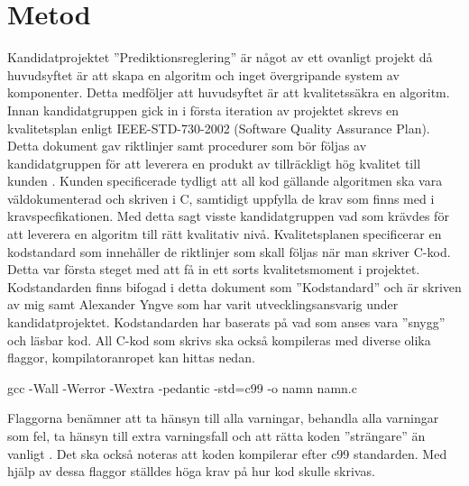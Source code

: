 \section{Metod}
Kandidatprojektet ''Prediktionsreglering'' är något av ett ovanligt projekt då huvudsyftet är att skapa en algoritm och inget övergripande system av komponenter. Detta medföljer att huvudsyftet är att kvalitetssäkra en algoritm.
\newline
\newline
Innan kandidatgruppen gick in i första iteration av projektet skrevs en kvalitetsplan enligt IEEE-STD-730-2002 (Software Quality Assurance Plan). Detta dokument gav riktlinjer samt procedurer som bör följas av kandidatgruppen för att leverera en produkt av tillräckligt hög kvalitet till kunden \citep{SQAP}. Kunden specificerade tydligt att all kod gällande algoritmen ska vara väldokumenterad och skriven i C, samtidigt uppfylla de krav som finns med i kravspecfikationen. Med detta sagt visste kandidatgruppen vad som krävdes för att leverera en algoritm till rätt kvalitativ nivå. Kvalitetsplanen specificerar en kodstandard som innehåller de riktlinjer som skall följas när man skriver C-kod. Detta var första steget med att få in ett sorts kvalitetsmoment i projektet. Kodstandarden finns bifogad i detta dokument som ''Kodstandard'' och är skriven av mig samt Alexander Yngve som har varit utvecklingsansvarig under kandidatprojektet. Kodstandarden har baserats på vad som anses vara ''snygg'' och läsbar kod. All C-kod som skrivs ska också kompileras med diverse olika flaggor, kompilatoranropet kan hittas nedan.
\begin{tcolorbox}[boxrule=1pt,leftrule=5pt,arc=0pt,auto outer arc]
gcc -Wall -Werror -Wextra -pedantic -std=c99 -o namn namn.c
\end{tcolorbox}
\noindent Flaggorna benämner att ta hänsyn till alla varningar, behandla alla varningar som fel, ta hänsyn till extra varningsfall och att rätta koden ''strängare'' än vanligt \citep{gccflags}. Det ska också noteras att koden kompilerar efter c99 standarden. Med hjälp av dessa flaggor ställdes höga krav på hur kod skulle skrivas. 
\newline
\newline
